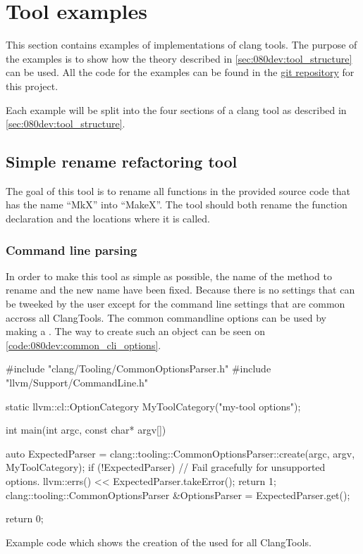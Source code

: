 \section{Tool examples}

This section contains examples of implementations of clang tools. The purpose of the examples is to show how the theory described in \cref{sec:080dev:tool_structure} can be used. All the code for the examples can be found in the \href{https://github.com/mortenhaahr/RD/tree/main/examples}{git repository} for this project. 

Each example will be split into the four sections of a clang tool as described in \cref{sec:080dev:tool_structure}.

\subsection{Simple rename refactoring tool}

The goal of this tool is to rename all functions in the provided source code that has the name ``MkX'' into ``MakeX''. The tool should both rename the function declaration and the locations where it is called.

\subsubsection*{Command line parsing}

In order to make this tool as simple as possible, the name of the method to rename and the new name have been fixed. Because there is no settings that can be tweeked by the user except for the command line settings that are common accross all ClangTools. The common commandline options can be used by making a . The way to create such an object can be seen on \cref{code:080dev:common_cli_options}.

\begin{listing}[H]
    \begin{cppcode}
#include "clang/Tooling/CommonOptionsParser.h"
#include "llvm/Support/CommandLine.h"

static llvm::cl::OptionCategory MyToolCategory("my-tool options");

int main(int argc, const char* argv[]) {
	auto ExpectedParser = clang::tooling::CommonOptionsParser::create(argc, argv, MyToolCategory);
	if (!ExpectedParser) {
		// Fail gracefully for unsupported options.
		llvm::errs() << ExpectedParser.takeError();
		return 1;
	}
	clang::tooling::CommonOptionsParser &OptionsParser = ExpectedParser.get();

    return 0;
}
    \end{cppcode}
    \caption{Example code which shows the creation of the  used for all ClangTools.}
    \label{code:080dev:common_cli_options}
\end{listing}

